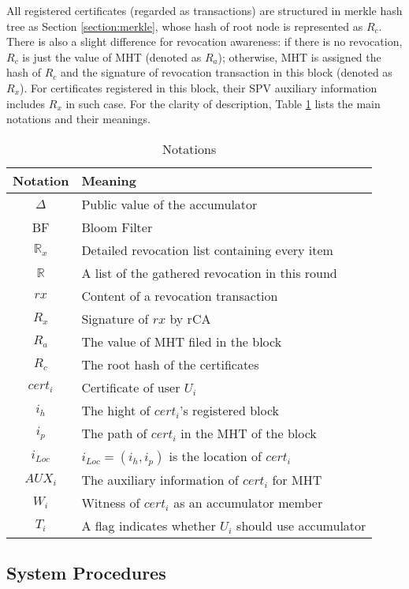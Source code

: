 \documentclass[conference]{IEEEtran}
\begin{document}
All registered certificates (regarded as transactions) are structured in merkle hash tree as Section \ref{section:merkle}, whose hash of root node is represented as $R_c$. There is also a slight difference for revocation awareness: if there is no revocation, $R_c$ is just the value of MHT (denoted as $R_a$); otherwise, MHT is assigned the hash of $R_c$ and the signature of revocation transaction in this block (denoted as $R_x$). 
For certificates registered in this block, their SPV auxiliary information includes $R_x$ in such case.
For the clarity of description, Table \ref{tab:notation} lists the main notations and their meanings.

\begin{table}[h]
	\caption{Notations}\label{tab:notation}
	\centering
	\begin{tabular}{c|l}
		\hline\hline
		Notation & Meaning \\\hline
		$\Delta$ & Public value of the accumulator\\
		BF & Bloom Filter\\
		$\mathbb{R}_x$ & Detailed revocation list containing every item\\
		$\mathbb{R}$ & A list of the gathered revocation in this round\\
		$rx$ & Content of a revocation transaction\\
		$R_x$ & Signature of $rx$ by rCA \\
		$R_a$ & The value of MHT filed in the block\\
		$R_c$ & The root hash of the certificates \\
		$cert_i$ & Certificate of user $U_i$\\
		$i_h$ & The hight of $cert_i$'s registered block \\
		$i_p$ & The path of $cert_i$ in the MHT of the block \\
		$i_{Loc}$ & $i_{Loc} = (i_h, i_p)$ is the location of $cert_i$ \\
		$AUX_i$ & The auxiliary information of $cert_i$ for MHT \\
		$W_i$ & Witness of $cert_i$ as an accumulator member \\
		$T_i$ & A flag indicates whether $U_i$ should use accumulator \\
		\hline
	\end{tabular}
\end{table}

\subsection{System Procedures}
\end{document}
